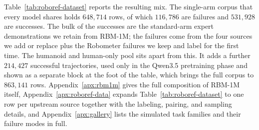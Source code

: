 Table~\ref{tab:roboref-dataset} reports the resulting mix. The single-arm corpus that every model shares holds $648{,}714$ rows, of which $116{,}786$ are failures and $531{,}928$ are successes. The bulk of the successes are the standard-arm expert demonstrations we retain from RBM-1M; the failures come from the four sources we add or replace plus the Robometer failures we keep and label for the first time. The humanoid and human-only pool sits apart from this. It adds a further $214{,}427$ successful trajectories, used only in the Qwen3.5 pretraining phase and shown as a separate block at the foot of the table, which brings the full corpus to $863{,}141$ rows. Appendix~\ref{apx:rbm1m} gives the full composition of RBM-1M itself, Appendix~\ref{apx:roboref-data} expands Table~\ref{tab:roboref-dataset} to one row per upstream source together with the labeling, pairing, and sampling details, and Appendix~\ref{apx:gallery} lists the simulated task families and their failure modes in full.

